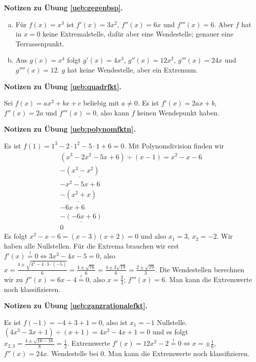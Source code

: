 \documentclass[%
11pt,%
twoside,%
titlepage,%
german,%
headsepline%
]{scrartcl}
\theoremstyle{definition}
\theoremstyle{plain}
\newcommand{\concatueb}[1]{ueb:#1}%
\newcommand{\concatlsg}[1]{lsg:#1}%
\newenvironment{lsg}[1]{%
    \par\noindent\textbf{Notizen zu Übung \ref{\concatueb{#1}}.}%
    \label{\concatlsg{#1}}
}{%
    \par%
}
\begin{document}
\begin{lsg}{gegenbsp}
    \begin{enumerate}[a)]
        \item Für $f(x)=x^3$ ist $f'(x)=3x^2$, $f''(x)=6x$ und $f'''(x)=6$. Aber $f$ hat in $x=0$ keine Extremalstelle, dafür aber eine Wendestelle; genauer eine Terrassenpunkt.
        \item Aus $g(x)=x^4$ folgt $g'(x)=4x^3$, $g''(x)=12x^2$, $g'''(x)=24x$ und $g''''(x)=12$. $g$ hat keine Wendestelle, aber ein Extremum.
    \end{enumerate}
\end{lsg}
 \begin{lsg}{quadrfkt}
     Sei $f(x)=ax^2+bx+c$ beliebig mit $a\neq0$. Es ist $f'(x)=2ax+b$, $f''(x)=2a$ und $f'''(x)=0$, also kann $f$ keinen Wendepunkt haben.
 \end{lsg}
 \begin{lsg}{polynomfktn}
     Es ist $f(1)=1^3-2\cdot1^2-5\cdot1+6=0$. Mit Polynomdivision finden wir
     \begin{align*}
         &(x^3-2x^2-5x+6) \div (x-1) = x^2-x-6\\
         &\underline{-(x^3-x^2)}\\
         &-x^2-5x+6\\
         &\underline{-(x^2+x)}\\
         &-6x+6\\
         &\underline{-(-6x+6)}\\
         &0
     \end{align*}
     Es folgt $x^2-x-6=(x-3)(x+2)=0$ und also $x_1=3$, $x_2=-2$. Wir haben alle Nullstellen. Für die Extrema brauchen wir erst $f'(x)\stackrel{!}{=}0\Leftrightarrow 3x^2-4x-5=0$, also $x=\frac{4\pm\sqrt{4^2-4\cdot3\cdot(-5)}}{6}=\frac{4\pm\sqrt{76}}{6}=\frac{4\pm2\sqrt{19}}{6}=\frac{2\pm\sqrt{19}}{3}$. Die Wendestellen berechnen wir zu $f''(x)=6x-4\stackrel{!}{=}0$, also $x=\frac{2}{3}$; $f'''(x)=6$. Man kann die Extremwerte noch klassifizieren.
 \end{lsg}
\begin{lsg}{ganzrationalefkt}
    Es ist $f(-1)=-4+3+1=0$, also ist $x_1=-1$ Nullstelle. $(4x^3-3x+1)\div(x+1)=4x^2-4x+1=0$ und es folgt $x_{2,3}=\frac{4\pm\sqrt{16-16}}{8}=\frac{1}{2}$. Extremwerte $f'(x)=12x^2-2\stackrel{!}{=}0\Leftrightarrow x=\pm\frac{1}{6}$, $f''(x)=24x$. Wendestelle bei $0$. Man kann die Extremwerte noch klassifizieren.
\end{lsg}
\end{document}
